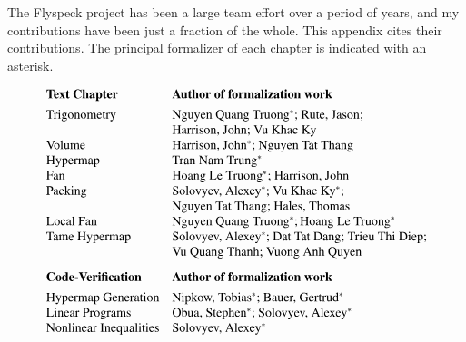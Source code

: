 The Flyspeck project has been a large team effort over a period of years, 
and my contributions have
been just a fraction of the whole.   This
appendix cites their contributions. The principal formalizer of each
chapter is indicated with an asterisk.

\def\x#1{\text{#1}}

\[
\begin{array}{lll}
\x{\bf Text~Chapter} & \x{\bf Author~of~formalization~work}
\vspace{4pt}\\
\x{Trigonometry} & \x{Nguyen Quang Truong\ast; Rute, Jason;}\\
  &\x{Harrison, John; Vu Khac Ky}\\
\x{Volume} & \x{Harrison, John\ast; Nguyen Tat Thang}\\
\x{Hypermap} &  \x{Tran Nam Trung}\ast\\
\x{Fan} & \x{Hoang Le Truong\ast; Harrison, John}\\
\x{Packing} & \x{Solovyev, Alexey\ast; Vu Khac Ky\ast;}\\
&\x{Nguyen Tat Thang; Hales, Thomas}\\
\x{Local Fan} & \x{Nguyen Quang Truong\ast}; \x{Hoang Le Truong\ast}\\
\x{Tame Hypermap} & \x{Solovyev, Alexey\ast; Dat Tat Dang; Trieu Thi Diep;}\\
&\x{Vu Quang Thanh;  Vuong Anh Quyen}\vspace{8pt}\\
\x{\bf Code-Verification} & \x{\bf Author~of~formalization~work}
\vspace{4pt}\\
\x{Hypermap Generation} & \x{Nipkow, Tobias\ast; Bauer, Gertrud\ast}\\
\x{Linear Programs} & \x{Obua, Stephen\ast; Solovyev, Alexey\ast}\\
\x{Nonlinear Inequalities} &  \x{Solovyev, Alexey\ast}\\
\end{array}
\]


\[
\begin{array}{lll}

\end{array}
\]


\newpage